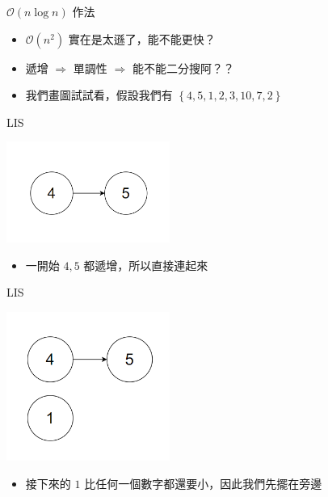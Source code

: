 \documentclass[aspectratio=169]{beamer}
\begin{document}
    \begin{frame}{$\mathcal{O}(n\log{n})$ 作法} 
        \begin{itemize}
            \item<1-> $\mathcal{O}(n^2)$ 實在是太遜了，能不能更快？
            \item<2-> 遞增 $\Rightarrow$ 單調性 $\Rightarrow$ 能不能二分搜阿？？
            \item<2-> 我們畫圖試試看，假設我們有 $\left\{ 4, 5, 1, 2, 3, 10, 7, 2 \right\}$
        \end{itemize}
    \end{frame}

    \begin{frame}{LIS}
        \begin{center}
            \includegraphics[width=0.4\textwidth]{img/LIS-1.png}
        \end{center}

        \begin{itemize}
            \item 一開始 $4, 5$ 都遞增，所以直接連起來
        \end{itemize}
    \end{frame}

    \begin{frame}{LIS}
        \begin{center}
            \includegraphics[width=0.4\textwidth]{img/LIS-2.png}
        \end{center}

        \begin{itemize}
            \item 接下來的 $1$ 比任何一個數字都還要小，因此我們先擺在旁邊
        \end{itemize}
    \end{frame}
\end{document}
